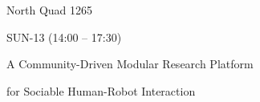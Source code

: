 \documentclass{article}
\begin{document}
\rssheader[2in]


\rssbig
\begin{center}
North Quad 1265
\end{center}

\vfill

\rssmed
\begin{center}
SUN-13 (14:00 -- 17:30)
\end{center}

\rsssm
\begin{center}
A Community-Driven Modular Research Platform \par \noindent for Sociable
Human-Robot Interaction
\end{center}

\vfill
\end{document}
